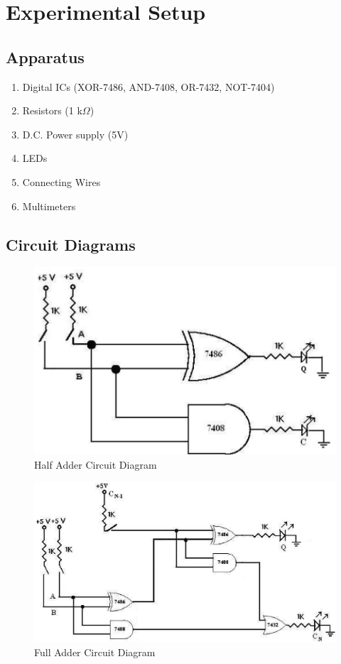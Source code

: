 \section{Experimental Setup}
\subsection*{Apparatus}

\begin{enumerate}
    \item Digital ICs (XOR-7486, AND-7408, OR-7432, NOT-7404) 
    \item Resistors (1 k$\Omega$)
    \item D.C. Power supply (5V)
    \item LEDs
    \item Connecting Wires
    \item Multimeters
\end{enumerate}

\subsection*{Circuit Diagrams}
\begin{figure}[H]
    \centering
    \includegraphics[width=0.55\columnwidth]{images/c-half-add.png}
    \caption{Half Adder Circuit Diagram}
    \label{half-add}
\end{figure}

\begin{figure}[H]
    \centering
    \includegraphics[width=0.8\columnwidth]{images/c-full-add.png}
    \caption{Full Adder Circuit Diagram}
    \label{full-add}
\end{figure}

